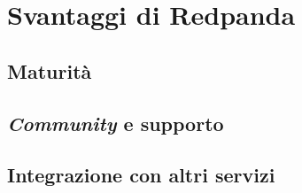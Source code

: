 \section{Svantaggi di Redpanda}
\subsection{Maturità}
\subsection{\textit{Community} e supporto}
\subsection{Integrazione con altri servizi}


